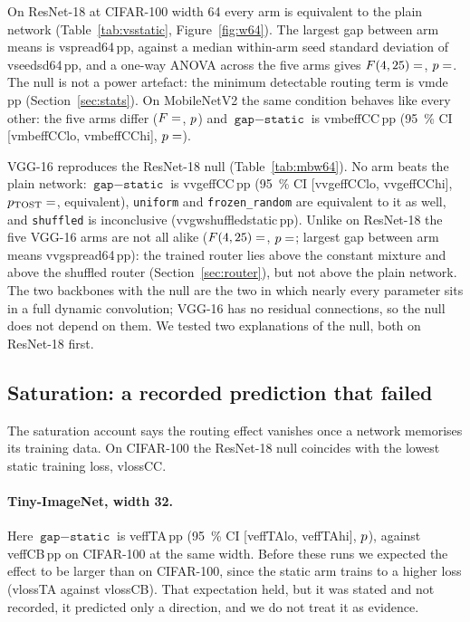 \documentclass[10pt,a4paper]{article}
\newcommand{\V}[1]{\csname v#1\endcsname}
\begin{document}
On ResNet-18 at CIFAR-100 width 64 every arm is equivalent to the plain
network (Table~\ref{tab:vsstatic}, Figure~\ref{fig:w64}). The largest gap
between arm means is \V{spread64}\,pp, against a median within-arm seed
standard deviation of \V{seedsd64}\,pp, and a one-way ANOVA across the five
arms gives $F(4,25)=\V{anovaF}$, $p=\V{anovaP}$. The null is not a power
artefact: the minimum detectable routing term is \V{mde}\,pp
(Section~\ref{sec:stats}). On MobileNetV2 the same condition behaves like
every other: the five arms differ ($F=\V{mbanovaF}$, $p\V{mbanovaP}$) and
$\texttt{gap}-\texttt{static}$ is \V{mbeffCC}\,pp (\SI{95}{\percent} CI
[\V{mbeffCClo}, \V{mbeffCChi}], $p=\V{mbeffCCp}$).

VGG-16 reproduces the ResNet-18 null (Table~\ref{tab:mbw64}). No arm beats
the plain network: $\texttt{gap}-\texttt{static}$ is \V{vgeffCC}\,pp
(\SI{95}{\percent} CI [\V{vgeffCClo}, \V{vgeffCChi}],
$p_{\text{TOST}}=\V{vgeffCCT}$, equivalent), \texttt{uniform} and
\texttt{frozen\_random} are equivalent to it as well, and
\texttt{shuffled} is inconclusive (\V{vgwshuffledstatic}\,pp). Unlike on
ResNet-18 the five VGG-16 arms are not all alike ($F(4,25)=\V{vganovaF}$,
$p=\V{vganovaP}$; largest gap between arm means \V{vgspread64}\,pp): the
trained router lies above the constant mixture and above the shuffled
router (Section~\ref{sec:router}), but not above the plain network. The
two backbones with the null are the two in which nearly every parameter
sits in a full dynamic convolution; VGG-16 has no residual connections,
so the null does not depend on them. We tested two explanations of the
null, both on ResNet-18 first.

\subsection{Saturation: a recorded prediction that failed}

The saturation account says the routing effect vanishes once a network
memorises its training data. On CIFAR-100 the ResNet-18 null coincides
with the lowest static training loss, \V{lossCC}.

\paragraph{Tiny-ImageNet, width 32.} Here $\texttt{gap}-\texttt{static}$
is \V{effTA}\,pp (\SI{95}{\percent} CI [\V{effTAlo}, \V{effTAhi}],
$p\V{effTAp}$), against \V{effCB}\,pp on CIFAR-100 at the same width.
Before these runs we expected the effect to be larger than on CIFAR-100,
since the static arm trains to a higher loss (\V{lossTA} against
\V{lossCB}). That expectation held, but it was stated and not recorded,
it predicted only a direction, and we do not treat it as evidence.
\end{document}
